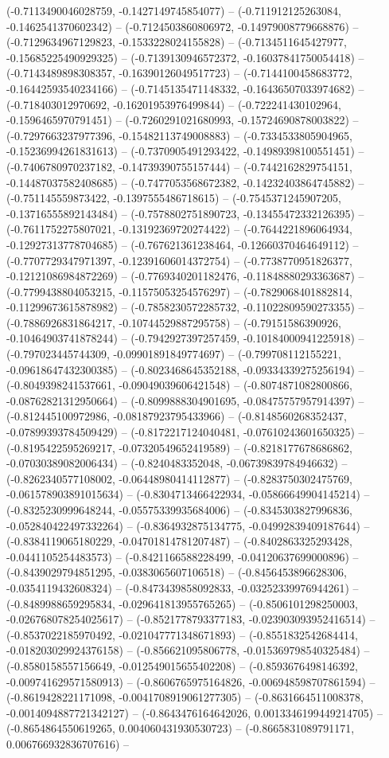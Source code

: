 (-0.7113490046028759, -0.1427149745854077) -- (-0.711912125263084, -0.1462541370602342) -- (-0.7124503860806972, -0.14979008779668876) -- (-0.7129634967129823, -0.1533228024155828) -- (-0.7134511645427977, -0.15685225490929325) -- (-0.7139130946572372, -0.16037841750054418) -- (-0.7143489898308357, -0.16390126049517723) -- (-0.7144100458683772, -0.16442593540234166) -- (-0.7145135471148332, -0.16436507033974682) -- (-0.718403012970692, -0.16201953976499844) -- (-0.722241430102964, -0.1596465970791451) -- (-0.7260291021680993, -0.15724690878003822) -- (-0.7297663237977396, -0.15482113749008883) -- (-0.7334533805904965, -0.15236994261831613) -- (-0.7370905491293422, -0.14989398100551451) -- (-0.7406780970237182, -0.14739390755157444) -- (-0.7442162829754151, -0.14487037582408685) -- (-0.7477053568672382, -0.14232403864745882) -- (-0.751145559873422, -0.1397555486718615) -- (-0.7545371245907205, -0.13716555892143484) -- (-0.7578802751890723, -0.13455472332126395) -- (-0.7611752275807021, -0.13192369720274422) -- (-0.7644221896064934, -0.12927313778704685) -- (-0.767621361238464, -0.12660370464649112) -- (-0.7707729347971397, -0.12391606014372754) -- (-0.7738770951826377, -0.12121086984872269) -- (-0.7769340201182476, -0.11848880293363687) -- (-0.7799438804053215, -0.11575053254576297) -- (-0.7829068401882814, -0.11299673615878982) -- (-0.7858230572285732, -0.11022809590273355) -- (-0.7886926831864217, -0.10744529887295758) -- (-0.79151586390926, -0.10464903741878244) -- (-0.7942927397257459, -0.10184000941225918) -- (-0.797023445744309, -0.09901891849774697) -- (-0.799708112155221, -0.09618647432300385) -- (-0.8023468645352188, -0.09334339275256194) -- (-0.8049398241537661, -0.09049039606421548) -- (-0.8074871082800866, -0.08762821312950664) -- (-0.8099888304901695, -0.08475757957914397) -- (-0.812445100972986, -0.08187923795433966) -- (-0.8148560268352437, -0.07899393784509429) -- (-0.8172217124040481, -0.07610243601650325) -- (-0.8195422595269217, -0.07320549652419589) -- (-0.8218177678686862, -0.07030389082006434) -- (-0.8240483352048, -0.06739839784946632) -- (-0.8262340577108002, -0.06448980414112877) -- (-0.8283750302475769, -0.061578903891015634) -- (-0.8304713466422934, -0.05866649904145214) -- (-0.8325230999648244, -0.05575339935684006) -- (-0.8345303827996836, -0.052840422497332264) -- (-0.8364932875134775, -0.04992839409187644) -- (-0.8384119065180229, -0.04701814781207487) -- (-0.8402863325293428, -0.0441105254483573) -- (-0.8421166588228499, -0.04120637699000896) -- (-0.8439029794851295, -0.0383065607106518) -- (-0.8456453896628306, -0.0354119432608324) -- (-0.8473439858092833, -0.03252339976944261) -- (-0.8489988659295834, -0.029641813955765265) -- (-0.8506101298250003, -0.026768078254025617) -- (-0.8521778793377183, -0.023903093952416514) -- (-0.8537022185970492, -0.021047771348671893) -- (-0.8551832542684414, -0.018203029924376158) -- (-0.856621095806778, -0.015369798540325484) -- (-0.8580158557156649, -0.012549015655402208) -- (-0.8593676498146392, -0.009741629571580913) -- (-0.8606765975164826, -0.006948598707861594) -- (-0.8619428221171098, -0.0041708919061277305) -- (-0.8631664511008378, -0.0014094887721342127) -- (-0.8643476164642026, 0.0013346199449214705) -- (-0.8654864550619265, 0.004060431930530723) -- (-0.8665831089791171, 0.006766932836707616) -- 
